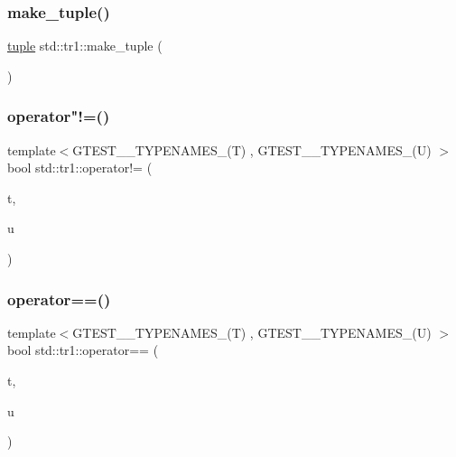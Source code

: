 \subsubsection{\texorpdfstring{make\_tuple()}{make\_tuple()}}
{\footnotesize\ttfamily \mbox{\hyperlink{classstd_1_1tr1_1_1tuple}{tuple}} std\+::tr1\+::make\+\_\+tuple (\begin{DoxyParamCaption}{ }\end{DoxyParamCaption})\hspace{0.3cm}{\ttfamily [inline]}}

\mbox{\label{namespacestd_1_1tr1_a058882c51de469b5e78d29076f864940}} 
\subsubsection{\texorpdfstring{operator"!=()}{operator!=()}}
{\footnotesize\ttfamily template$<$G\+T\+E\+S\+T\+\_\+\_\+\+T\+Y\+P\+E\+N\+A\+M\+E\+S\+\_\+(\+T) , G\+T\+E\+S\+T\+\_\+\_\+\+T\+Y\+P\+E\+N\+A\+M\+E\+S\+\_\+(\+U) $>$ \\
bool std\+::tr1\+::operator!= (\begin{DoxyParamCaption}\item[{const \mbox{\hyperlink{namespacestd_1_1tr1_aa636d3269bf1f368a7bc09ff158bc482}{G\+T\+E\+S\+T\+\_\+10\+\_\+\+T\+U\+P\+L\+E\+\_\+}}(T)\&}]{t,  }\item[{const \mbox{\hyperlink{namespacestd_1_1tr1_aa636d3269bf1f368a7bc09ff158bc482}{G\+T\+E\+S\+T\+\_\+10\+\_\+\+T\+U\+P\+L\+E\+\_\+}}(U)\&}]{u }\end{DoxyParamCaption})\hspace{0.3cm}{\ttfamily [inline]}}

\mbox{\label{namespacestd_1_1tr1_af4516de784404381f9b14797694b6311}} 
\subsubsection{\texorpdfstring{operator==()}{operator==()}}
{\footnotesize\ttfamily template$<$G\+T\+E\+S\+T\+\_\+\_\+\+T\+Y\+P\+E\+N\+A\+M\+E\+S\+\_\+(\+T) , G\+T\+E\+S\+T\+\_\+\_\+\+T\+Y\+P\+E\+N\+A\+M\+E\+S\+\_\+(\+U) $>$ \\
bool std\+::tr1\+::operator== (\begin{DoxyParamCaption}\item[{const \mbox{\hyperlink{namespacestd_1_1tr1_aa636d3269bf1f368a7bc09ff158bc482}{G\+T\+E\+S\+T\+\_\+10\+\_\+\+T\+U\+P\+L\+E\+\_\+}}(T)\&}]{t,  }\item[{const \mbox{\hyperlink{namespacestd_1_1tr1_aa636d3269bf1f368a7bc09ff158bc482}{G\+T\+E\+S\+T\+\_\+10\+\_\+\+T\+U\+P\+L\+E\+\_\+}}(U)\&}]{u }\end{DoxyParamCaption})\hspace{0.3cm}{\ttfamily [inline]}}



